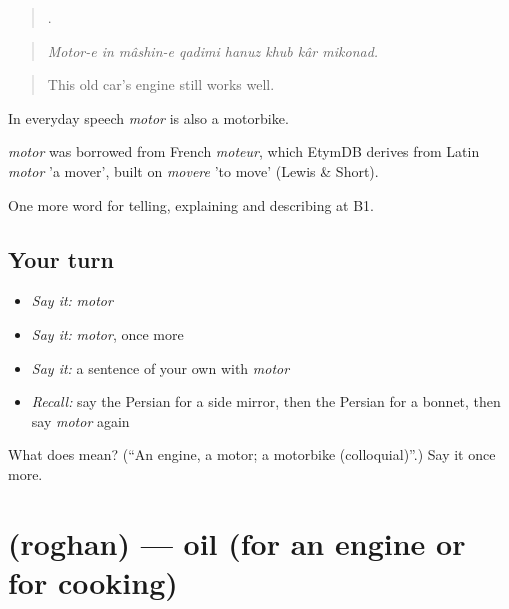 \begin{quote}
       .
\end{quote}

\begin{quote}
\emph{Motor-e in mâshin-e qadimi hanuz khub kâr mikonad.}
\end{quote}

\begin{quote}
This old car's engine still works well.
\end{quote}

In everyday speech \emph{motor} is also a motorbike.

\begin{cousinweb}
\emph{motor} was borrowed from French \emph{moteur}, which EtymDB derives from Latin \emph{motor} 'a mover', built on \emph{movere} 'to move' (Lewis \& Short).
\end{cousinweb}

\begin{grammarlens}[title={What you've built}]
One more word for telling, explaining and describing at B1.
\end{grammarlens}

\subsection*{Your turn}
\begin{itemize}
\raggedright
  \item \emph{Say it:} \emph{motor}
  \item \emph{Say it:} \emph{motor}, once more
  \item \emph{Say it:} a sentence of your own with \emph{motor}
  \item \emph{Recall:} say the Persian for a side mirror, then the Persian for a bonnet, then say \emph{motor} again
\end{itemize}

\begin{tcolorbox}[breakable,colback=teal!4,colframe=teal!35!black,title={Before you move on}]
What does  mean? (\textquotedblleft{}An engine, a motor; a motorbike (colloquial)\textquotedblright{}.) Say it once more.
\end{tcolorbox}
\section[\texorpdfstring{\fa{روغن} (roghan)}{روغن (roghan)}]{ (roghan) — oil (for an engine or for cooking)}


